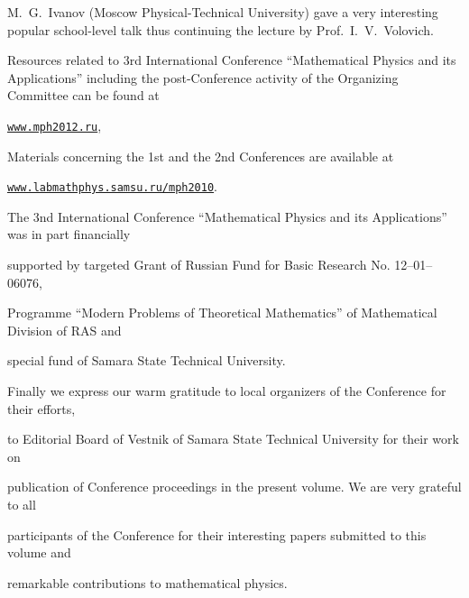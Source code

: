 M.~G.~Ivanov (Moscow Physical-Technical University) gave a very interesting popular school-level talk thus continuing the lecture by Prof.~I.~V.~Volovich.





Resources related to 3rd International Conference ``Mathematical Physics and its Applications'' including the post-Conference activity of the Organizing Committee can be found at





\centerline{\href{http://mph2012.ru}{\tt www.mph2012.ru},}

\smallskip





Materials concerning the 1st and the 2nd Conferences are available at



\centerline{\href{http://www.labmathphys.samsu.ru/mph2010}{\tt www.labmathphys.samsu.ru/mph2010}.}

\smallskip





The 3nd International Conference ``Mathematical Physics and its Applications'' was in part financially

supported by targeted Grant of Russian Fund for Basic Research No. 12--01--06076,

Programme ``Modern Problems of Theoretical Mathematics'' of Mathematical Division of RAS and

special fund of Samara State Technical University.



Finally we express our warm gratitude to local organizers of the Conference for their efforts,

to Editorial Board of Vestnik of Samara State Technical University for their work on

publication of Conference proceedings in the present volume. We are very grateful to all

participants of the Conference for their interesting papers submitted to this volume and

remarkable contributions to mathematical physics.





\vspace{-3mm}



